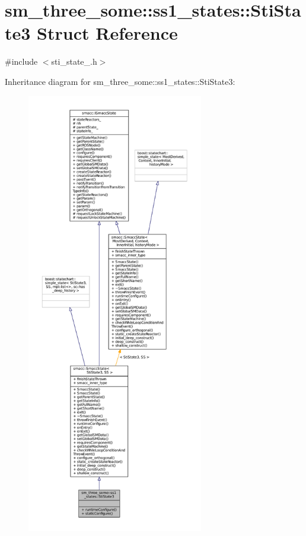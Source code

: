 \hypertarget{structsm__three__some_1_1ss1__states_1_1StiState3}{}\section{sm\+\_\+three\+\_\+some\+:\+:ss1\+\_\+states\+:\+:Sti\+State3 Struct Reference}
\label{structsm__three__some_1_1ss1__states_1_1StiState3}


{\ttfamily \#include $<$sti\+\_\+state\+\_.\+h$>$}



Inheritance diagram for sm\+\_\+three\+\_\+some\+:\+:ss1\+\_\+states\+:\+:Sti\+State3\+:
\nopagebreak
\begin{figure}[H]
\begin{center}
\leavevmode
\includegraphics[height=550pt]{structsm__three__some_1_1ss1__states_1_1StiState3__inherit__graph}
\end{center}
\end{figure}


